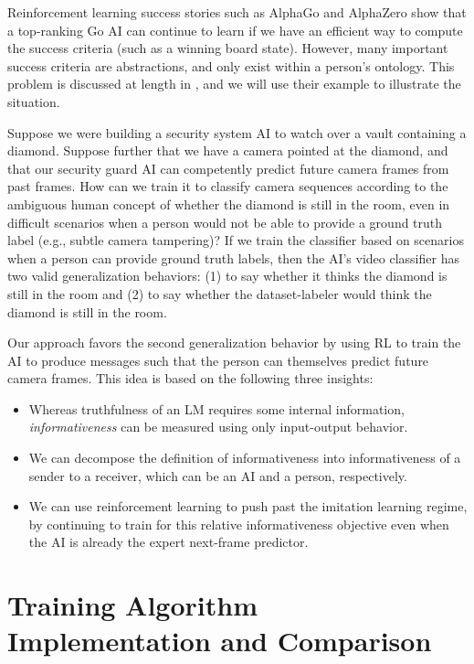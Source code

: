 \documentclass{article} %
\begin{document}
Reinforcement learning success stories such as AlphaGo \citep{Silver2016} and AlphaZero \citep{Silver2017} show that a top-ranking Go AI can continue to learn if we have an efficient way to compute the success criteria (such as a winning board state). However, many important success criteria are abstractions, and only exist within a person's ontology. This problem is discussed at length in \citet{christiano2021eliciting}, and we will use their example to illustrate the situation. 

Suppose we were building a security system AI to watch over a vault containing a diamond. Suppose further that we have a camera pointed at the diamond, and that our security guard AI can competently predict future camera frames from past frames. How can we train it to classify camera sequences according to the ambiguous human concept of whether the diamond is still in the room, even in difficult scenarios when a person would not be able to provide a ground truth label (e.g., subtle camera tampering)? If we train the classifier based on scenarios when a person can provide ground truth labels, then the AI's video classifier has two valid generalization behaviors: (1) to say whether it thinks the diamond is still in the room and (2) to say whether the dataset-labeler would think the diamond is still in the room. 

Our approach favors the second generalization behavior by using RL to train the AI to produce messages such that the person can themselves predict future camera frames.
This idea is based on the following three insights:
\begin{itemize}
\item Whereas truthfulness of an LM requires some internal information, \emph{informativeness} can be measured using only input-output behavior.
\item We can decompose the definition of informativeness into informativeness of a sender to a receiver, which can be an AI and a person, respectively.
\item We can use reinforcement learning to push past the imitation learning regime, by continuing to train for this relative informativeness objective even when the AI is already the expert next-frame predictor.
\end{itemize}

\section{Training Algorithm Implementation and Comparison}
\label{app:training_algorithms}
\end{document}
